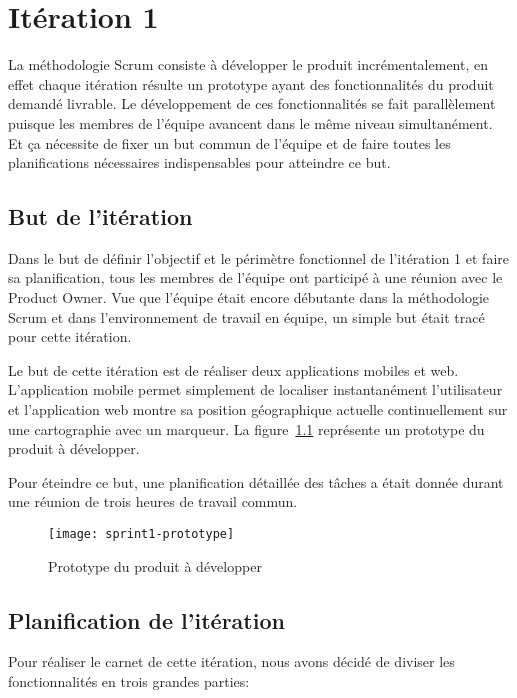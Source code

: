 \chapter{Itération 1}

La méthodologie Scrum consiste à développer le produit incrémentalement, en
effet chaque itération résulte un prototype ayant des fonctionnalités du
produit demandé livrable. Le développement de ces fonctionnalités se fait
parallèlement puisque les membres de l'équipe avancent dans le même niveau
simultanément. Et ça nécessite de fixer un but commun de l'équipe et de faire
toutes les planifications nécessaires indispensables pour atteindre ce but.

\section{But de l'itération}

Dans le but de définir l'objectif et le périmètre fonctionnel de l'itération 1
et faire sa planification, tous les membres de l'équipe ont participé à une
réunion avec le Product Owner. Vue que l'équipe était encore débutante dans la
méthodologie Scrum et dans l'environnement de travail en équipe, un simple but
était tracé pour cette itération.

Le but de cette itération est de réaliser deux applications mobiles et web.
L'application mobile permet simplement de localiser instantanément
l'utilisateur et l'application web montre sa position géographique actuelle
continuellement sur une cartographie avec un marqueur. La
figure~\ref{fig:sprint1-prototype} représente un prototype du produit à
développer.

Pour éteindre ce but, une planification détaillée des tâches a était donnée
durant une réunion de trois heures de travail commun.

\begin{figure}[H]
    \centering
    \texttt{[image: sprint1-prototype]}
    \caption{Prototype du produit à développer}
\label{fig:sprint1-prototype}
\end{figure}

\section{Planification de l'itération}

Pour réaliser le carnet de cette itération, nous avons décidé de diviser les
fonctionnalités en trois grandes parties:


